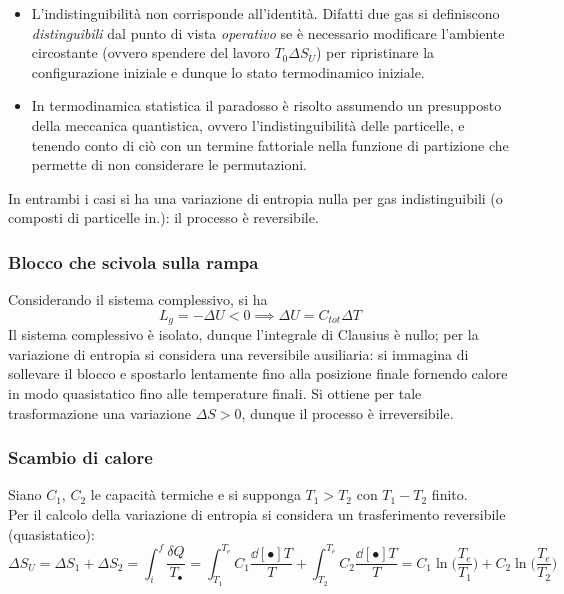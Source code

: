 \documentclass[10pt, oneside]{book}
\newcommand{\clausius}[2]{\frac{\delta Q_{#1}}{T_{#2}}}
\begin{document}
\begin{itemize}
\item L'indistinguibilità non corrisponde all'identità. Difatti due gas si definiscono \textit{distinguibili} dal punto di vista \textit{operativo} se è necessario modificare l'ambiente circostante (ovvero spendere del lavoro $T_0 \Delta S_U$) per ripristinare la configurazione iniziale e dunque lo stato termodinamico iniziale.
\item In termodinamica statistica il paradosso è risolto assumendo un presupposto della meccanica quantistica, ovvero l'indistinguibilità delle particelle, e tenendo conto di ciò con un termine fattoriale nella funzione di partizione che permette di non considerare le permutazioni.
\end{itemize}
In entrambi i casi si ha una variazione di entropia nulla per gas indistinguibili (o composti di particelle in.): il processo è reversibile.

\subsubsection{Blocco che scivola sulla rampa}
Considerando il sistema complessivo, si ha
\[L_g = - \Delta U < 0 \implies \Delta U = C_{tot} \Delta T\]
Il sistema complessivo è isolato, dunque l'integrale di Clausius è nullo; per la variazione di entropia si considera una reversibile ausiliaria: si immagina di sollevare il blocco e spostarlo lentamente fino alla posizione finale fornendo calore in modo quasistatico fino alle temperature finali. Si ottiene per tale trasformazione una variazione $\Delta S > 0$, dunque il processo è irreversibile.

\subsubsection{Scambio di calore}
Siano $C_1$, $C_2$ le capacità termiche e si supponga $T_1 > T_2$ con $T_1 - T_2$ finito.\\
Per il calcolo della variazione di entropia si considera un trasferimento reversibile (quasistatico):
\[\Delta S_U = \Delta S_1 + \Delta S_2 = \int_i^f \clausius{}{•} = \int_{T_1}^{T_e} C_1 \frac{\dd[•]{T}}{T} + \int_{T_2}^{T_e} C_2 \frac{\dd[•]{T}}{T} = C_1 \ln \bigg( \frac{T_e}{T_1} \bigg) + C_2 \ln \bigg( \frac{T_e}{T_2} \bigg)\]
\end{document}
